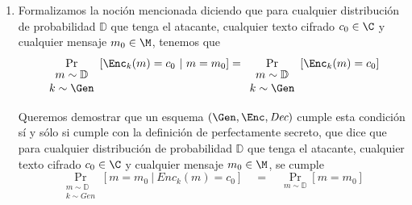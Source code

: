\begin{enumerate}
    Nuevamente, por la definición de OTP sabemos que dada una llave $k$ existe un único mensaje $m$ tal que $\Enc_k(m)=c_0$. Luego lo anterior es igual a

    $$\frac{1}{|\M|}\sum_{k\in\K}\Gen(k)=\frac{1}{|\M|}$$

    Recapitulando, tenemos
    $$\underset{ \begin{array}{cc} m\sim\mathbb{D}\\ k\sim\Gen \end{array} } {\Pr}[m=m_0\ |\ \Enc_k(m)=c_0] = \frac{\frac{1}{|\M|}\cdot \Gen(k_0)}{\frac{1}{|\M|}}=\Gen(k_0)$$

    Esto concluye la demostración, dado que 
    $$\underset{ \begin{array}{cc} m\sim\mathbb{D}\\ k\sim\Gen \end{array} } {\Pr}[m=m_0\ |\ \Enc_k(m)=c_0] =\Gen(k_0)>\frac{1}{|\K|}=\frac{1}{|\M|}=\mathbb{D}(m_0)=\underset{m\sim \mathbb{D}} {\Pr}[m=m_0].$$

  \item
    Formalizamos la noción mencionada diciendo que para cualquier distribución de probabilidad $\mathbb{D}$ que tenga el atacante, cualquier texto cifrado $c_0\in\C$ y cualquier mensaje $m_0\in\M$, tenemos que
    \begin{equation}
      \label{eq:alt-perfect-secrecy}
      \underset{ \begin{array}{cc} m\sim\mathbb{D}\\ k\sim\Gen \end{array} } {\Pr}[\Enc_k(m)=c_0\ |\ m=m_0]=\underset{ \begin{array}{cc} m\sim\mathbb{D}\\ k\sim\Gen \end{array} } {\Pr}[\Enc_k(m)=c_0]
    \end{equation}

    Queremos demostrar que un esquema $(\Gen, \Enc, \textit{Dec})$ cumple esta condición sí y sólo si cumple con la definición de perfectamente secreto, que dice que para cualquier distribución de probabilidad $\mathbb{D}$ que tenga el atacante, cualquier texto cifrado $c_0\in\C$ y cualquier mensaje $m_0\in\M$, se cumple
    \begin{equation}
      \label{eq:perfect-secrecy}
      \underset{ \begin{array}{cc} m\sim\mathbb{D}\\ k\sim\textit{Gen} \end{array} } {\Pr}[m=m_0\ |\ \textit{Enc}_k(m)=c_0]\quad = \quad \underset{m\sim \mathbb{D}} {\Pr}[m=m_0]
    \end{equation}


\end{enumerate}
